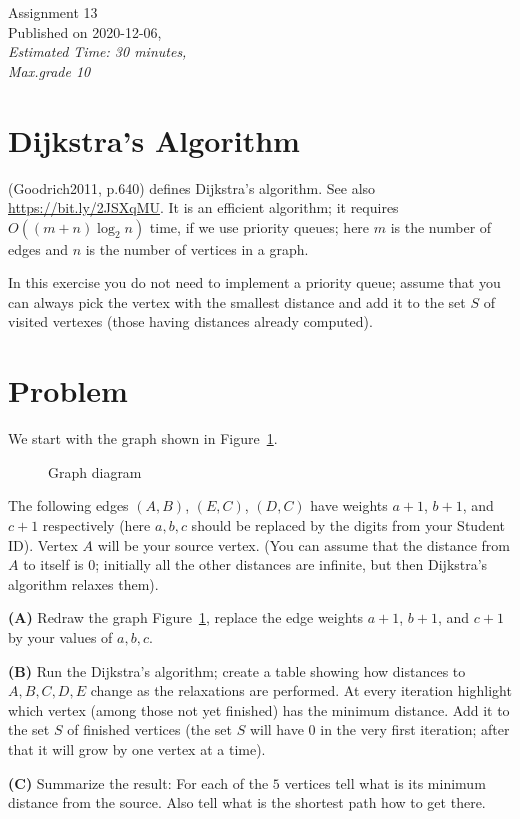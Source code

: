 \documentclass[a4paper,12pt]{article}
\begin{document}
\twocolumn

\thispagestyle{empty}

\begin{center}
{\Large Assignment 13}\\
{\Large Published on 2020-12-06,}\\
{\em Estimated Time: 30 minutes,}\\
{\em Max.grade 10\textperthousand} 
\end{center}


\section{Dijkstra's Algorithm}

(Goodrich2011, p.640) defines Dijkstra's algorithm. 
See also \url{https://bit.ly/2JSXqMU}. 
It is an efficient algorithm; it requires $O((m+n)\log_2 n)$ time, if 
we use priority queues; here $m$ is the number of edges and $n$ is the number 
of vertices in a graph.
 
In this exercise you do not need to implement a priority queue; 
assume that you can always pick the vertex with the smallest distance and 
add it to the set $S$ of visited vertexes (those having distances already computed). 



\section{Problem}

We start with the graph shown in Figure~\ref{fig:problem-graph}.

\begin{figure}[!htb]
\caption{\label{fig:problem-graph} Graph diagram}
\end{figure}

The following edges $(A,B)$, $(E,C)$, $(D,C)$ have weights 
$a+1$, $b+1$, and $c+1$ respectively 
(here $a,b,c$ should be replaced by the digits from your Student ID). 
Vertex $A$ will be your source vertex. (You can assume that the distance 
from $A$ to itself is $0$; initially all the other distances are infinite, but 
then Dijkstra's algorithm relaxes them). 


\vspace{10pt}
{\bf (A)} Redraw the graph Figure~\ref{fig:problem-graph}, 
replace the edge weights $a+1$, $b+1$, and $c+1$ by your values of $a,b,c$. 


\vspace{10pt}
{\bf (B)} Run the Dijkstra's algorithm; 
create a table showing how distances to $A,B,C,D,E$ 
change as the relaxations are performed.
At every iteration highlight which vertex (among those not yet finished) 
has the minimum distance. Add it to the set $S$ of finished vertices 
(the set $S$ will have $0$ in the very first iteration; after that it will grow by 
one vertex at a time). 

\vspace{10pt}
{\bf (C)} Summarize the result: For each of the $5$ vertices 
tell what is its minimum distance from the source. 
Also tell what is the shortest path how to get there. 
\end{document}
